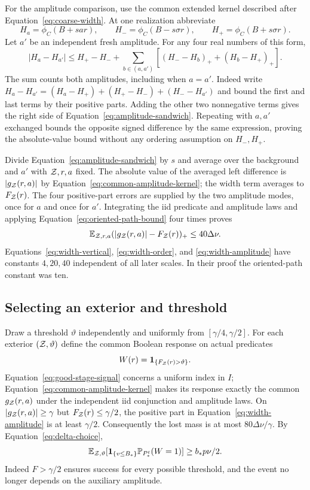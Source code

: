 For the amplitude comparison, use the common extended kernel described
after Equation~\ref{eq:coarse-width}. At one realization abbreviate
\[
 H_a=\phi_C(B+sar),\qquad H_-=\phi_C(B-s\sigma r),\qquad
 H_+=\phi_C(B+s\sigma r).
\]
Let $a'$ be an independent fresh amplitude. For any four real numbers
of this form,
\begin{equation}\label{eq:amplitude-sandwich}
 |H_a-H_{a'}|\le H_+-H_-
   +\sum_{b\in(a,a')}
          [(H_--H_b)_++(H_b-H_+)_+].
\end{equation}
The sum counts both amplitudes, including when $a=a'$.
Indeed write
$H_a-H_{a'}=(H_a-H_+)+(H_+-H_-)+(H_--H_{a'})$ and bound the first
and last terms by their positive parts. Adding the other two nonnegative
terms gives the right side of Equation~\ref{eq:amplitude-sandwich}.
Repeating with $a,a'$ exchanged bounds the opposite signed difference
by the same expression, proving the absolute-value bound without any
ordering assumption on $H_-,H_+$.

Divide Equation~\ref{eq:amplitude-sandwich} by $s$ and average over
the background and $a'$ with $\mathcal Z,r,a$ fixed. The absolute value of the
averaged left difference is $|g_{\mathcal Z}(r,a)|$ by
Equation~\ref{eq:common-amplitude-kernel}; the width term averages to
$F_{\mathcal Z}(r)$. The four positive-part errors are supplied by the two
amplitude modes, once for $a$ and once for $a'$. Integrating the iid
predicate and amplitude laws and applying
Equation~\ref{eq:oriented-path-bound} four times proves
\begin{equation}\label{eq:width-amplitude}
 \mathbb E_{\mathcal Z,r,a}(|g_{\mathcal Z}(r,a)|-F_{\mathcal Z}(r))_+\le40\Delta\nu.
\end{equation}
Equations~\ref{eq:width-vertical}, \ref{eq:width-order}, and
\ref{eq:width-amplitude} have constants $4,20,40$ independent of all
later scales. In their proof the oriented-path constant was ten.

\subsection{Selecting an exterior and threshold}

Draw a threshold $\vartheta$ independently and uniformly from
$[\gamma/4,\gamma/2]$. For each exterior $(\mathcal Z,\vartheta)$ define
the common Boolean response on actual predicates
\[
 W(r)=\mathbf 1_{\{F_{\mathcal Z}(r)>\vartheta\}}.
\]
Equation~\ref{eq:good-stage-signal} concerns a uniform index in $I$;
Equation~\ref{eq:common-amplitude-kernel} makes its response exactly the
common $g_{\mathcal Z}(r,a)$ under the independent iid conjunction and amplitude
laws. On $|g_{\mathcal Z}(r,a)|\ge\gamma$ but
$F_{\mathcal Z}(r)\le\gamma/2$, the positive part in
Equation~\ref{eq:width-amplitude} is at least $\gamma/2$. Consequently
the lost mass is at most $80\Delta\nu/\gamma$. By
Equation~\ref{eq:delta-choice},
\begin{equation}\label{eq:threshold-success}
 \mathbb E_{\mathcal Z,\vartheta}
   [\mathbf 1_{\{v\le B_*\}}\mathbb P_{P_*^t}(W=1)]
 \ge b_*p\nu/2.
\end{equation}
Indeed $F>\gamma/2$ ensures success for every possible threshold, and
the event no longer depends on the auxiliary amplitude.

